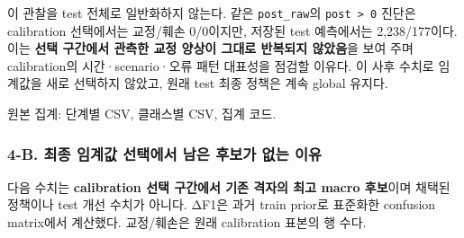 이 관찰을 test 전체로 일반화하지 않는다. 같은 \texttt{post\_\allowbreak{}\allowbreak{}raw\allowbreak{}}의 \texttt{post > 0\allowbreak{}} 진단은 calibration 선택에서는 교정/\allowbreak{}훼손 0/\allowbreak{}0이지만, 저장된 test 예측에서는 2,238/\allowbreak{}177이다. 이는 \textbf{선택 구간에서 관측한 교정 양상이 그대로 반복되지 않았음}을 보여 주며 calibration의 시간·scenario·오류 패턴 대표성을 점검할 이유다. 이 사후 수치로 임계값을 새로 선택하지 않았고, 원래 test 최종 정책은 계속 global 유지다.

원본 집계: 단계별 CSV, 클래스별 CSV, 집계 코드.

\subsubsection{4-B. 최종 임계값 선택에서 남은 후보가 없는 이유}
다음 수치는 \textbf{calibration 선택 구간에서 기존 격자의 최고 macro 후보}이며 채택된 정책이나 test 개선 수치가 아니다. ΔF1은 과거 train prior로 표준화한 confusion matrix에서 계산했다. 교정/\allowbreak{}훼손은 원래 calibration 표본의 행 수다.

